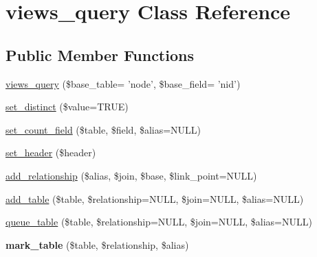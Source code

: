 \hypertarget{classviews__query}{
\section{views\_\-query Class Reference}
\label{classviews__query}
}
\subsection*{Public Member Functions}
\begin{CompactItemize}
\item 
\hyperlink{classviews__query_fa6130b3c7d7a5a5edb03069bb7d8995}{views\_\-query} (\$base\_\-table= 'node', \$base\_\-field= 'nid')
\item 
\hyperlink{classviews__query_cb3f17ef4ae3d80a44ee7b6962165247}{set\_\-distinct} (\$value=TRUE)
\item 
\hyperlink{classviews__query_b669461223ddaae12248f28b4ccfb525}{set\_\-count\_\-field} (\$table, \$field, \$alias=NULL)
\item 
\hyperlink{classviews__query_83e8dfa6c88442e0f34b00d467f3b35e}{set\_\-header} (\$header)
\item 
\hyperlink{classviews__query_db0faccc1a266ce414a3dc58f4de22d0}{add\_\-relationship} (\$alias, \$join, \$base, \$link\_\-point=NULL)
\item 
\hyperlink{classviews__query_52cdfc5396008424c4c232cca1a8f8bb}{add\_\-table} (\$table, \$relationship=NULL, \$join=NULL, \$alias=NULL)
\item 
\hyperlink{classviews__query_0ed3905be8cddfdbde96a39569686bcb}{queue\_\-table} (\$table, \$relationship=NULL, \$join=NULL, \$alias=NULL)
\item 
\hypertarget{classviews__query_60d0c1c4304248692893fda0a3281af3}{
\textbf{mark\_\-table} (\$table, \$relationship, \$alias)}
\label{classviews__query_60d0c1c4304248692893fda0a3281af3}


\end{CompactItemize}
